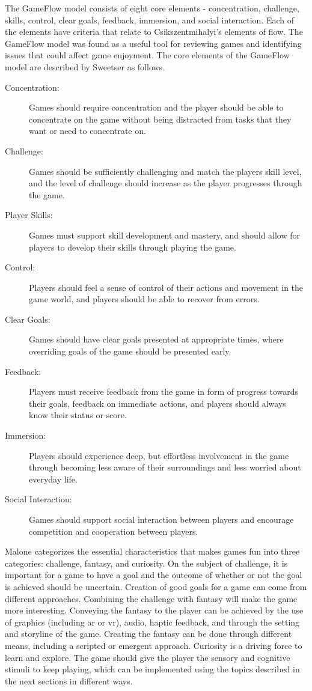 The GameFlow model consists of eight core elements - concentration, challenge, skills, control, clear goals, feedback, immersion, and social interaction. Each of the elements have criteria that relate to Csikszentmihalyi's elements of flow. The GameFlow model was found as a useful tool for reviewing games and identifying issues that could affect game enjoyment. The core elements of the GameFlow model are described by Sweetser \cite{sweetser2005gameflow} as follows. 
\begin{description}
\item[Concentration:] Games should require concentration and the player should be able to concentrate on the game without being distracted from tasks that they want or need to concentrate on. 
\item[Challenge:] Games should be sufficiently challenging and match the players skill level, and the level of challenge should increase as the player progresses through the game. 
\item[Player Skills:] Games must support skill development and mastery, and should allow for players to develop their skills through playing the game. 
\item[Control:] Players should feel a sense of control of their actions and movement in the game world, and players should be able to recover from errors. 
\item[Clear Goals:] Games should have clear goals presented at appropriate times, where overriding goals of the game should be presented early. 
\item[Feedback:] Players must receive feedback from the game in form of progress towards their goals, feedback on immediate actions, and players should always know their status or score. 
\item[Immersion:] Players should experience deep, but effortless involvement in the game through becoming less aware of their surroundings and less worried about everyday life. 
\item[Social Interaction:] Games should support social interaction between players and encourage competition and cooperation between players.
\end{description}

Malone \cite{malone1980makes} categorizes the essential characteristics that makes games fun into three categories: challenge, fantasy, and curiosity.
On the subject of challenge, it is important for a game to have a goal and the outcome of whether or not the goal is achieved should be uncertain.
Creation of good goals for a game can come from different approaches.
Combining the challenge with fantasy will make the game more interesting.
Conveying the fantasy to the player can be achieved by the use of graphics (including \gls{ar} or \gls{vr}), audio, haptic feedback, and through the setting and storyline of the game.
Creating the fantasy can be done through different means, including a scripted or emergent approach.
Curiosity is a driving force to learn and explore.
The game should give the player the sensory and cognitive stimuli to keep playing, which can be implemented using the topics described in the next sections in different ways.


